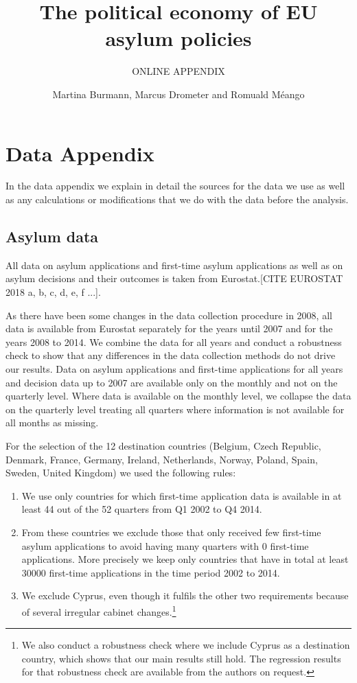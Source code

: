 \documentclass[11pt,a4paper]{scrartcl}
\begin{document}
	\title{The political economy of EU asylum policies}
	\subtitle{ONLINE APPENDIX}
	\author{Martina Burmann, Marcus Drometer and Romuald Méango}
	\maketitle

\tableofcontents

\clearpage
\FloatBarrier
\section{Data Appendix}
In the data appendix we explain in detail the sources for the data we use as well as any calculations or modifications that we do with the data before the analysis. 

\subsection{Asylum data}
All data on asylum applications and first-time asylum applications as well as on asylum decisions and their outcomes is taken from Eurostat.[CITE EUROSTAT 2018 a, b, c, d, e, f ...]. 

As there have been some changes in the data collection procedure in 2008, all data is available from Eurostat separately for the years until 2007 and for the years 2008 to 2014. We combine the data for all years and conduct a robustness check to show that any differences in the data collection methods do not drive our results. Data on asylum applications and first-time applications for all years and decision data up to 2007 are available only on the monthly and not on the quarterly level. Where data is available on the monthly level, we collapse the data on the quarterly level treating all quarters where information is not available for all months as missing. 

For the selection of the 12 destination countries (Belgium, Czech Republic, Denmark, France, Germany, Ireland, Netherlands, Norway, Poland, Spain, Sweden, United Kingdom) we used the following rules:
\begin{enumerate}
	\item We use only countries for which first-time application data is available in at least 44 out of the 52 quarters from Q1 2002 to Q4 2014.
	\item From these countries we exclude those that only received few first-time asylum applications to avoid having many quarters with 0 first-time applications. More precisely we keep only countries that have in total at least 30000 first-time applications in the time period 2002 to 2014.
	\item We exclude Cyprus, even though it fulfils the other two requirements because of several irregular cabinet changes.\footnote{We also conduct a robustness check where we include Cyprus as a destination country, which shows that our main results still hold. The regression results for that robustness check are available from the authors on request.}
\end{enumerate}   
\end{document}
